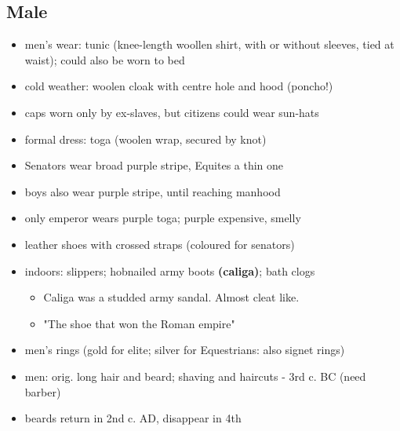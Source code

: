 \documentclass[12pt, twoside]{article}
\begin{document}
\subsection{Male}
\begin{itemize}
\item men's wear: tunic (knee-length woollen shirt, with or without sleeves, tied at waist); could also be worn to bed
\item cold weather: woolen cloak with centre hole and hood (poncho!)
\item caps worn only by ex-slaves, but citizens could wear sun-hats
\item formal dress: toga (woolen wrap, secured by knot)
\item Senators wear broad purple stripe, Equites a thin one
\item boys also wear purple stripe, until reaching manhood
\item only emperor wears purple toga; purple expensive, smelly
\item leather shoes with crossed straps (coloured for senators)
\item indoors: slippers; hobnailed army boots \textbf{(caliga)}; bath clogs
	\begin{itemize}
	\item Caliga was a studded army sandal.  Almost cleat like.
	\item "The shoe that won the Roman empire"
	\end{itemize}
\item men's rings (gold for elite;  silver for Equestrians: also signet rings)
\item men: orig. long hair and beard; shaving and haircuts - 3rd c. BC (need barber)
\item beards return in 2nd c. AD, disappear in 4th
\end{itemize}
\end{document}

